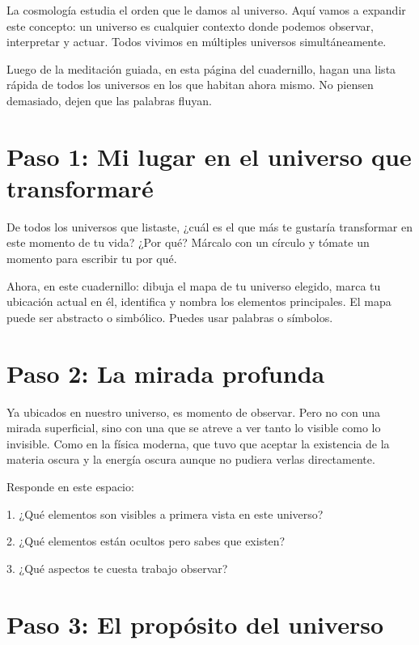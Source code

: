 \documentclass[statementpaper,oneside,article,10pt]{memoir}
\begin{document}
La cosmología estudia el orden que le damos al universo. Aquí vamos a expandir este concepto: un universo es cualquier contexto donde podemos observar, interpretar y actuar. Todos vivimos en múltiples universos simultáneamente.

Luego de la meditación guiada, en esta página del cuadernillo, hagan una lista rápida de todos los universos en los que habitan ahora mismo. No piensen demasiado, dejen que las palabras fluyan.

\newpage
\section{Paso 1: Mi lugar en el universo que transformaré}

De todos los universos que listaste, ¿cuál es el que más te gustaría transformar en este momento de tu vida? ¿Por qué?
Márcalo con un círculo y tómate un momento para escribir tu por qué.

Ahora, en este cuadernillo: dibuja el mapa de tu universo elegido, marca tu ubicación actual en él, identifica y nombra los elementos principales. El mapa puede ser abstracto o simbólico. Puedes usar palabras o símbolos. 
\newpage
\section{Paso 2: La mirada profunda}

Ya ubicados en nuestro universo, es momento de observar. Pero no con una mirada superficial, sino con una que se atreve a ver tanto lo visible como lo invisible. Como en la física moderna, que tuvo que aceptar la existencia de la materia oscura y la energía oscura aunque no pudiera verlas directamente.

Responde en este espacio:

1. ¿Qué elementos son visibles a primera vista en este universo?
\vspace{4cm}

2. ¿Qué elementos están ocultos pero sabes que existen?
\vspace{4cm}

3. ¿Qué aspectos te cuesta trabajo observar?
\vspace{4cm}

\newpage

\section{Paso 3: El propósito del universo}
\end{document}
